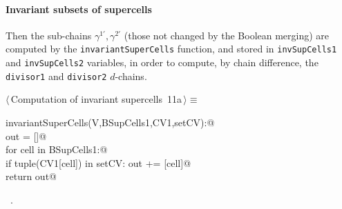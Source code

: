 \documentclass[11pt,oneside]{article}	%
\begin{document}
\paragraph{Invariant subsets of supercells}

Then the sub-chains $\gamma^{1'},\gamma^{2'}$ (those not changed by the Boolean merging) are computed by the \texttt{invariantSuperCells} function, and stored in \texttt{invSupCells1} and \texttt{invSupCells2} variables, in order to compute, by chain difference, the \texttt{divisor1} and \texttt{divisor2} $d$-chains.

\begin{flushleft} \small \label{scrap18}
\protect{}$\langle\,$Computation of invariant supercells\nobreak\ {\footnotesize 11a}$\,\rangle\equiv$
\vspace{-1ex}
\begin{list}{}{} \item
\mbox{}\verb@def invariantSuperCells(V,BSupCells1,CV1,setCV):@\\
\mbox{}\verb@   out = []@\\
\mbox{}\verb@   for cell in BSupCells1:@\\
\mbox{}\verb@      if tuple(CV1[cell]) in setCV: out += [cell]@\\
\mbox{}\verb@   return out@\\
\mbox{}\verb@@{\NWsep}
\end{list}
\vspace{-1ex}
\footnotesize\addtolength{\baselineskip}{-1ex}
\begin{list}{}{\setlength{\itemsep}{-\parsep}\setlength{\itemindent}{-\leftmargin}}
\item \NWtxtMacroRefIn\ .
\end{list}
\end{flushleft}
\end{document}
